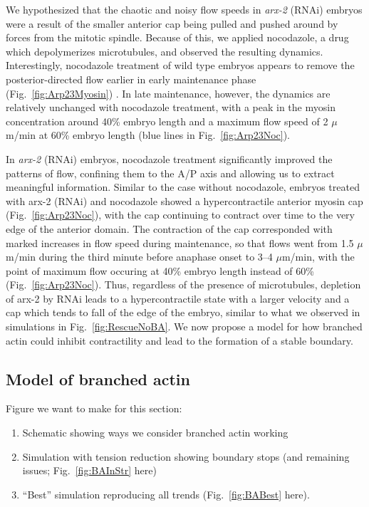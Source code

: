 \documentclass[11pt]{article}
\newcommand{\red}[1]{\color{red}#1\normalcolor}
\newcommand{\6}[1]{#1_{\text{6}}}
\newcommand{\3}[1]{#1_{\text{3}}}
\begin{document}
We hypothesized that the chaotic and noisy flow speeds in \emph{arx-2} (RNAi) embryos were a result of the smaller anterior cap being pulled and pushed around by forces from the mitotic spindle. Because of this, we applied nocodazole, a drug which depolymerizes microtubules, and observed the resulting dynamics. Interestingly, nocodazole treatment of wild type embryos appears to remove the posterior-directed flow earlier in early maintenance phase (Fig.\ \ref{fig:Arp23Myosin}) \cite{sailer2015dynamic}. In late maintenance, however, the dynamics are relatively unchanged with nocodazole treatment, with a peak in the myosin concentration around 40\% embryo length and a maximum flow speed of 2 $\mu$m/min at 60\% embryo length (blue lines in Fig.\ \ref{fig:Arp23Noc}).

In \emph{arx-2} (RNAi) embryos, nocodazole treatment significantly improved the patterns of flow, confining them to the A/P axis and allowing us to extract meaningful information. Similar to the case without nocodazole, embryos treated with arx-2 (RNAi) and nocodazole showed a hypercontractile anterior myosin cap (Fig.\ \ref{fig:Arp23Noc}), with the cap continuing to contract over time to the very edge of the anterior domain. The contraction of the cap corresponded with marked increases in flow speed during maintenance, so that flows went from 1.5 $\mu$m/min during the third minute before anaphase onset to 3--4 $\mu$m/min, with the point of maximum flow occuring at 40\% embryo length instead of 60\% (Fig.\ \ref{fig:Arp23Noc}). Thus, regardless of the presence of microtubules, depletion of arx-2 by RNAi leads to a hypercontractile state with a larger velocity and a cap which tends to fall of the edge of the embryo, similar to what we observed in simulations in Fig.\ \ref{fig:RescueNoBA}. We now propose a model for how branched actin could inhibit contractility and lead to the formation of a stable boundary.

\subsection{Model of branched actin}
\red{Figure we want to make for this section:
\begin{enumerate}[label=(\alph*),topsep=0pt,itemsep=-2ex]
\item Schematic showing ways we consider branched actin working
\item Simulation with tension reduction showing boundary stops (and remaining issues; Fig.\ \ref{fig:BAInStr} here)
\item ``Best'' simulation reproducing all trends (Fig.\ \ref{fig:BABest} here).
\end{enumerate}
}
\end{document}
